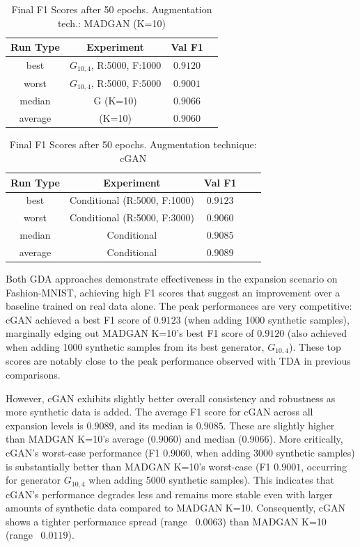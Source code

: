 \begin{table}[H]
	\vspace{-1.5em}
	\centering
	\begin{tabular}{|c|c|c|c|}
		\hline
		Run Type & Experiment & Val F1 \\ \hline
		best & \(G_{10, 4}\), R:5000, F:1000 & $0.9120$\\ \hline
		worst & \(G_{10, 4}\), R:5000, F:5000 & $0.9001$\\ \hline
		median & G (K=10) & $0.9066$\\ \hline
		average & (K=10) & $0.9060$
		\\ \hline
	\end{tabular}
    \caption{Final F1 Scores after 50 epochs. Augmentation tech.: MADGAN (K=10)}
        \label{tab:res_expansion_fashion_cgan_vs_madgan__madgan}
\end{table}
\begin{table}[H]
	\centering
	\vspace{-1.5em}
	\begin{tabular}{|c|c|c|c|c|}
		\hline
		Run Type & Experiment & Val F1 \\ \hline
		best & Conditional (R:5000, F:1000) & $0.9123$\\ \hline
		worst & Conditional (R:5000, F:3000) & $0.9060$\\ \hline
		median & Conditional & $0.9085$\\ \hline
		average & Conditional & $0.9089$
		\\ \hline
	\end{tabular}
    \caption{Final F1 Scores after 50 epochs. Augmentation technique: cGAN}
        \label{tab:res_expansion_fashion_cgan_vs_madgan__cgan}
\end{table}

Both GDA approaches demonstrate effectiveness in the expansion scenario on Fashion-MNIST, achieving high F1 scores that suggest an improvement over a baseline trained on real data alone. The peak performances are very competitive: cGAN achieved a best F1 score of $0.9123$ (when adding 1000 synthetic samples), marginally edging out MADGAN K=10's best F1 score of $0.9120$ (also achieved when adding 1000 synthetic samples from its best generator, \(G_{10,4}\)). These top scores are notably close to the peak performance observed with TDA in previous comparisons.

However, cGAN exhibits slightly better overall consistency and robustness as more synthetic data is added. The average F1 score for cGAN across all expansion levels is $0.9089$, and its median is $0.9085$. These are slightly higher than MADGAN K=10's average ($0.9060$) and median ($0.9066$). More critically, cGAN's worst-case performance (F1 $0.9060$, when adding 3000 synthetic samples) is substantially better than MADGAN K=10's worst-case (F1 $0.9001$, occurring for generator \(G_{10,4}\) when adding 5000 synthetic samples). This indicates that cGAN's performance degrades less and remains more stable even with larger amounts of synthetic data compared to MADGAN K=10. Consequently, cGAN shows a tighter performance spread (range ~$0.0063$) than MADGAN K=10 (range ~$0.0119$).

